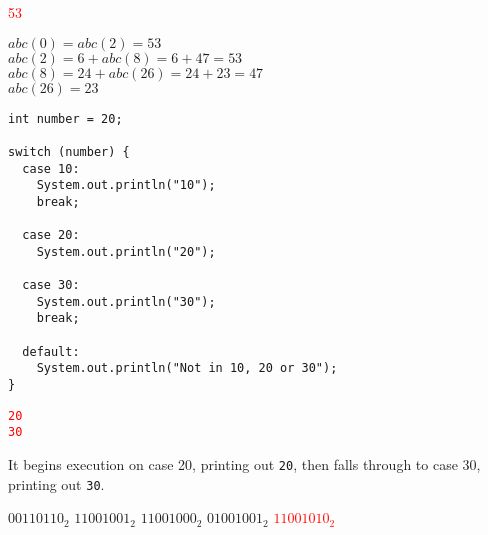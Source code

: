 \documentclass[11pt,addpoints]{exam}
\begin{document}
\begin{questions}
\begin{minipage}{\textwidth}
\begin{choices}
  \choice \textcolor{red}{53}
   \\
\end{choices}

$abc(0) = abc(2) = 53$ \\
$abc(2) = 6 + abc(8) = 6 + 47 = 53$ \\
$abc(8) = 24 + abc(26) = 24 + 23 = 47$ \\
$abc(26) = 23$ \\

\end{minipage}

\begin{minipage}{\textwidth}

\begin{verbatim}
int number = 20;

switch (number) {
  case 10:
    System.out.println("10");
    break;

  case 20:
    System.out.println("20");

  case 30:
    System.out.println("30");
    break;

  default:
    System.out.println("Not in 10, 20 or 30");
}
\end{verbatim}

\begin{choices}
  \choice \textcolor{red}{\tt 20\\30}
   \\
\end{choices}

It begins execution on case 20, printing out {\tt 20}, then falls through to case 30, printing out {\tt 30}. \\

\end{minipage}

\begin{minipage}{\textwidth}

\begin{choices}
  \choice $00110110_{2}$
  \choice $11001001_{2}$
  \choice $11001000_{2}$
  \choice $01001001_{2}$
  \choice \textcolor{red}{$11001010_{2}$} \\
\end{choices}


\end{minipage}
\end{questions}
\end{document}
